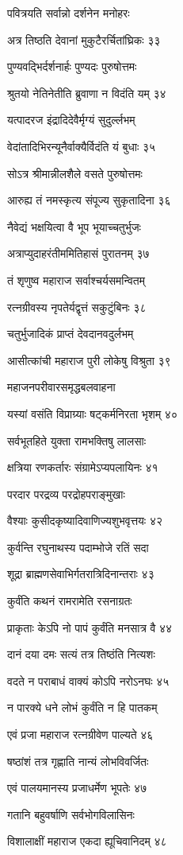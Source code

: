 पवित्रयति सर्वान्नो दर्शनेन मनोहरः

अत्र तिष्ठति देवानां मुकुटैरर्चितांघ्रिकः ३३

पुण्यवद्भिर्दर्शनार्हः पुण्यदः पुरुषोत्तमः

श्रुतयो नेतिनेतीति ब्रुवाणा न विदंति यम् ३४

यत्पादरज इंद्रादिदेवैर्मृग्यं सुदुर्ल्लभम्

वेदांतादिभिरन्यूनैर्वाक्यैर्विदंति यं बुधाः ३५

सोऽत्र श्रीमान्नीलशैले वसते पुरुषोत्तमः

आरुह्य तं नमस्कृत्य संपूज्य सुकृतादिना ३६

नैवेद्यं भक्षयित्वा वै भूप भूयाच्चतुर्भुजः

अत्राप्युदाहरंतीममितिहासं पुरातनम् ३७

तं शृणुष्व महाराज सर्वाश्चर्यसमन्वितम्

रत्नग्रीवस्य नृपतेर्यद्वृत्तं सकुटुंबिनः ३८

चतुर्भुजादिकं प्राप्तं देवदानवदुर्लभम्

आसीत्कांची महाराज पुरी लोकेषु विश्रुता ३९

महाजनपरीवारसमृद्धबलवाहना

यस्यां वसंति विप्राग्र्याः षट्कर्मनिरता भृशम् ४०

सर्वभूतहिते युक्ता रामभक्तिषु लालसाः

क्षत्रिया रणकर्तारः संग्रामेऽप्यपलायिनः ४१

परदार परद्रव्य परद्रोहपराङ्मुखाः

वैश्याः कुसीदकृष्यादिवाणिज्यशुभवृत्तयः ४२

कुर्वन्ति रघुनाथस्य पदाम्भोजे रतिं सदा

शूद्रा ब्राह्मणसेवाभिर्गतरात्रिदिनान्तराः ४३

कुर्वंति कथनं रामरामेति रसनाग्रतः

प्राकृताः केऽपि नो पापं कुर्वंति मनसात्र वै ४४

दानं दया दमः सत्यं तत्र तिष्ठंति नित्यशः

वदते न पराबाधं वाक्यं कोऽपि नरोऽनघः ४५

न पारक्ये धने लोभं कुर्वंति न हि पातकम्

एवं प्रजा महाराज रत्नग्रीवेण पाल्यते ४६

षष्ठांशं तत्र गृह्णाति नान्यं लोभविवर्जितः

एवं पालयमानस्य प्रजाधर्मेण भूपतेः ४७

गतानि बहुवर्षाणि सर्वभोगविलासिनः

विशालाक्षीं महाराज एकदा ह्यूचिवानिदम् ४८

